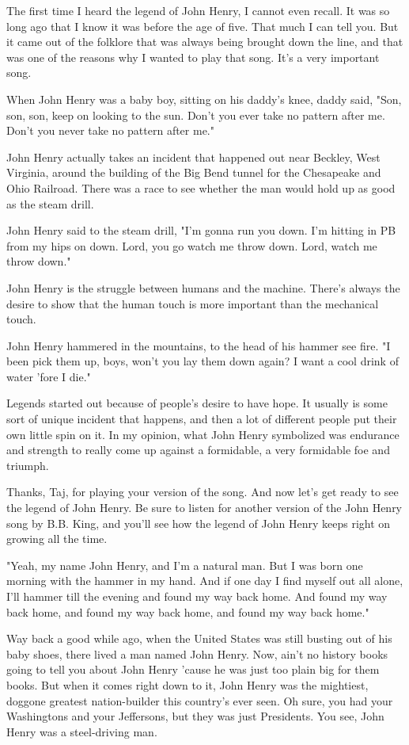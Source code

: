 The first time I heard the legend of John Henry, I cannot even recall. It was so long ago that I know it was before the age of five. That much I can tell you. But it came out of the folklore that was always being brought down the line, and that was one of the reasons why I wanted to play that song. It's a very important song.

When John Henry was a baby boy, sitting on his daddy's knee, daddy said, "Son, son, son, keep on looking to the sun. Don't you ever take no pattern after me. Don't you never take no pattern after me."

John Henry actually takes an incident that happened out near Beckley, West Virginia, around the building of the Big Bend tunnel for the Chesapeake and Ohio Railroad. There was a race to see whether the man would hold up as good as the steam drill.

John Henry said to the steam drill, "I'm gonna run you down. I'm hitting in PB from my hips on down. Lord, you go watch me throw down. Lord, watch me throw down."

John Henry is the struggle between humans and the machine. There's always the desire to show that the human touch is more important than the mechanical touch.

John Henry hammered in the mountains, to the head of his hammer see fire. "I been pick them up, boys, won't you lay them down again? I want a cool drink of water 'fore I die."

Legends started out because of people's desire to have hope. It usually is some sort of unique incident that happens, and then a lot of different people put their own little spin on it. In my opinion, what John Henry symbolized was endurance and strength to really come up against a formidable, a very formidable foe and triumph.

Thanks, Taj, for playing your version of the song. And now let's get ready to see the legend of John Henry. Be sure to listen for another version of the John Henry song by B.B. King, and you'll see how the legend of John Henry keeps right on growing all the time.

"Yeah, my name John Henry, and I'm a natural man. But I was born one morning with the hammer in my hand. And if one day I find myself out all alone, I'll hammer till the evening and found my way back home. And found my way back home, and found my way back home, and found my way back home."

Way back a good while ago, when the United States was still busting out of his baby shoes, there lived a man named John Henry. Now, ain't no history books going to tell you about John Henry 'cause he was just too plain big for them books. But when it comes right down to it, John Henry was the mightiest, doggone greatest nation-builder this country's ever seen. Oh sure, you had your Washingtons and your Jeffersons, but they was just Presidents. You see, John Henry was a steel-driving man.


